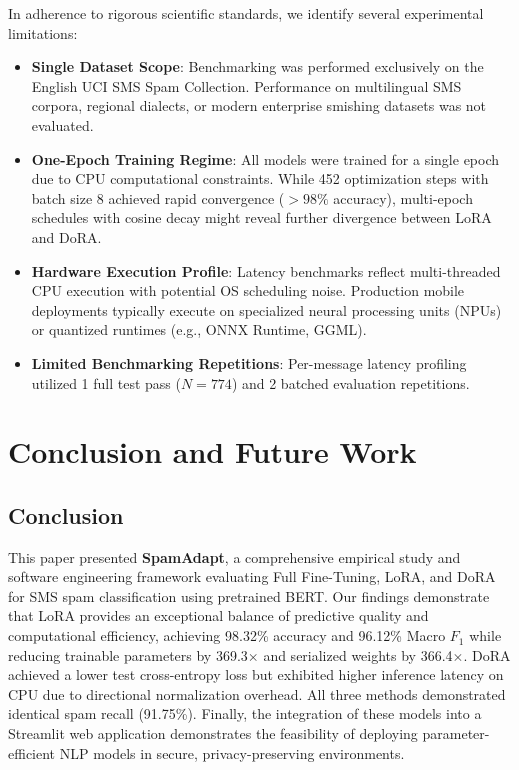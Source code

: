 \documentclass[conference]{IEEEtran}
\begin{document}
In adherence to rigorous scientific standards, we identify several experimental limitations:
\begin{itemize}
    \item \textbf{Single Dataset Scope}: Benchmarking was performed exclusively on the English UCI SMS Spam Collection. Performance on multilingual SMS corpora, regional dialects, or modern enterprise smishing datasets was not evaluated.
    \item \textbf{One-Epoch Training Regime}: All models were trained for a single epoch due to CPU computational constraints. While 452 optimization steps with batch size 8 achieved rapid convergence ($>98\%$ accuracy), multi-epoch schedules with cosine decay might reveal further divergence between LoRA and DoRA.
    \item \textbf{Hardware Execution Profile}: Latency benchmarks reflect multi-threaded CPU execution with potential OS scheduling noise. Production mobile deployments typically execute on specialized neural processing units (NPUs) or quantized runtimes (e.g., ONNX Runtime, GGML).
    \item \textbf{Limited Benchmarking Repetitions}: Per-message latency profiling utilized 1 full test pass ($N=774$) and 2 batched evaluation repetitions.
\end{itemize}

\section{Conclusion and Future Work}
\label{sec:conclusion}

\subsection{Conclusion}
This paper presented \textbf{SpamAdapt}, a comprehensive empirical study and software engineering framework evaluating Full Fine-Tuning, LoRA, and DoRA for SMS spam classification using pretrained BERT. Our findings demonstrate that LoRA provides an exceptional balance of predictive quality and computational efficiency, achieving 98.32\% accuracy and 96.12\% Macro $F_1$ while reducing trainable parameters by 369.3$\times$ and serialized weights by 366.4$\times$. DoRA achieved a lower test cross-entropy loss but exhibited higher inference latency on CPU due to directional normalization overhead. All three methods demonstrated identical spam recall (91.75\%). Finally, the integration of these models into a Streamlit web application demonstrates the feasibility of deploying parameter-efficient NLP models in secure, privacy-preserving environments.
\end{document}
